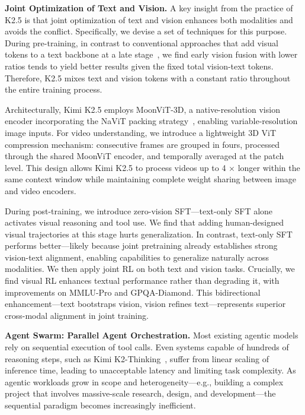 \documentclass{article}
\newcommand{\citep}[1]{\parencite{#1}}
\begin{document}
\textbf{Joint Optimization of Text and Vision.} A key insight from the practice of K2.5 is that joint optimization of text and vision enhances both modalities and avoids the conflict. Specifically, we devise a set of techniques for this purpose. During pre-training, in contrast to conventional approaches that add visual tokens to a text backbone at a late stage~\citep{bai2025qwen3vltechnicalreport,guo2025seed15vltechnicalreport}, we find early vision fusion with lower ratios tends to yield better results given the fixed total vision-text tokens. Therefore, K2.5 mixes text and vision tokens with a constant ratio throughout the entire training process. 

Architecturally, Kimi K2.5 employs MoonViT-3D, a native-resolution vision encoder incorporating the NaViT packing strategy~\citep{dehghani2023patchnpacknavit}, enabling variable-resolution image inputs. For video understanding, we introduce a lightweight 3D ViT compression mechanism: consecutive frames are grouped in fours, processed through the shared MoonViT encoder, and temporally averaged at the patch level. This design allows Kimi K2.5 to process videos up to 4 $\times$ longer within the same context window while maintaining complete weight sharing between image and video encoders.

During post-training, we introduce zero-vision SFT---text-only SFT alone activates visual reasoning and tool use. 
We find that adding human-designed visual trajectories at this stage hurts generalization. 
In contrast, text-only SFT performs better—likely because joint pretraining already establishes strong vision-text alignment, enabling capabilities to generalize naturally across modalities.
We then apply joint RL on both text and vision tasks. 
Crucially, we find visual RL enhances textual performance rather than degrading it, with improvements on MMLU-Pro and GPQA-Diamond. This bidirectional enhancement—text bootstraps vision, vision refines text—represents superior cross-modal alignment in joint training.

\textbf{Agent Swarm: Parallel Agent Orchestration.}
Most existing agentic models rely on sequential execution of tool calls. Even systems capable of hundreds of reasoning steps, such as Kimi K2-Thinking~\citep{moonshotai2025kimi}, suffer from linear scaling of inference time, leading to unacceptable latency and limiting task complexity. As agentic workloads grow in scope and heterogeneity—e.g., building a complex project that involves massive-scale research, design, and development—the sequential paradigm becomes increasingly inefficient.
\end{document}
